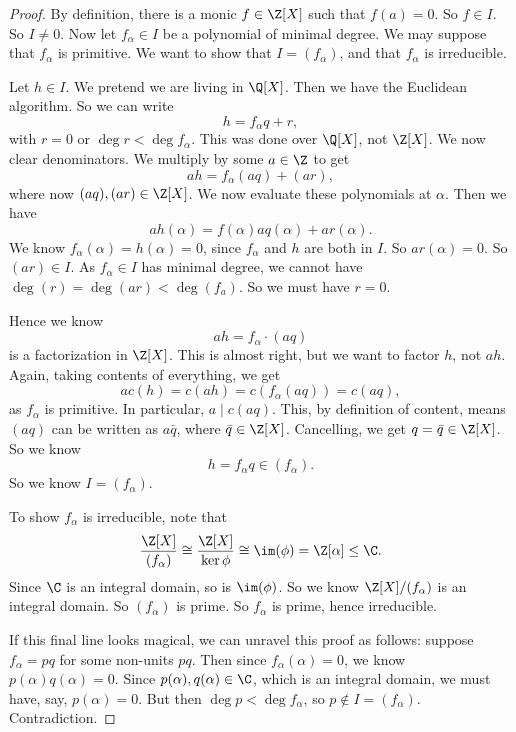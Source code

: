 \documentclass[a4paper]{article}
\begin{document}
\begin{proof}
  By definition, there is a monic $f \in \Z[X]$ such that $f(a) = 0$. So $f \in I$. So $I \not= 0$. Now let $f_\alpha \in I$ be a polynomial of minimal degree. We may suppose that $f_\alpha$ is primitive. We want to show that $I = (f_\alpha)$, and that $f_\alpha$ is irreducible.

  Let $h \in I$. We pretend we are living in $\Q[X]$. Then we have the Euclidean algorithm. So we can write
  \[
    h = f_\alpha q + r,
  \]
  with $r = 0$ or $\deg r < \deg f_\alpha$. This was done over $\Q[X]$, not $\Z[X]$. We now clear denominators. We multiply by some $a \in \Z$ to get
  \[
    ah = f_\alpha (aq) + (ar),
  \]
  where now $(aq), (ar) \in \Z[X]$. We now evaluate these polynomials at $\alpha$. Then we have
  \[
    a h(\alpha) = f(\alpha) aq(\alpha) + ar(\alpha).
  \]
  We know $f_\alpha(\alpha) = h(\alpha) = 0$, since $f_\alpha$ and $h$ are both in $I$. So $ar(\alpha) = 0$. So $(ar) \in I$. As $f_\alpha \in I$ has minimal degree, we cannot have $\deg (r) = \deg(ar) < \deg(f_a)$. So we must have $r = 0$.

  Hence we know
  \[
    a h = f_\alpha \cdot(aq)
  \]
  is a factorization in $\Z[X]$. This is almost right, but we want to factor $h$, not $ah$. Again, taking contents of everything, we get
  \[
    a c(h) = c(ah) = c(f_\alpha (aq)) = c(aq),
  \]
  as $f_\alpha$ is primitive. In particular, $a \mid c(aq)$. This, by definition of content, means $(aq)$ can be written as $a \bar{q}$, where $\bar{q} \in \Z[X]$. Cancelling, we get $q = \bar{q} \in \Z[X]$. So we know
  \[
    h = f_\alpha q \in (f_\alpha).
  \]
  So we know $I = (f_\alpha)$.

  To show $f_\alpha$ is irreducible, note that
  \[
    \frac{\Z[X]}{(f_\alpha)} \cong \frac{\Z[X]}{\ker \phi} \cong \im (\phi) = \Z[\alpha] \leq \C.
  \]
  Since $\C$ is an integral domain, so is $\im(\phi)$. So we know $\Z[X]/(f_\alpha)$ is an integral domain. So $(f_\alpha)$ is prime. So $f_\alpha$ is prime, hence irreducible.

  If this final line looks magical, we can unravel this proof as follows: suppose $f_\alpha = pq$ for some non-units $pq$. Then since $f_\alpha(\alpha) = 0$, we know $p(\alpha) q(\alpha) = 0$. Since $p(\alpha), q(\alpha) \in \C$, which is an integral domain, we must have, say, $p(\alpha) = 0$. But then $\deg p < \deg f_\alpha$, so $p \not\in I = (f_\alpha)$. Contradiction.
\end{proof}
\end{document}
